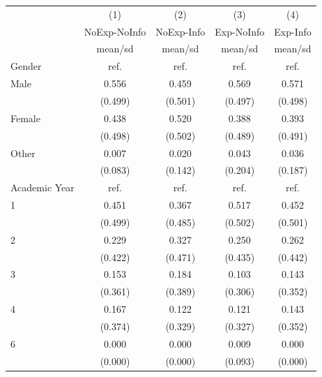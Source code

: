 {
\def\sym#1{\ifmmode^{#1}\else\(^{#1}\)\fi}
\begin{tabular}{l*{4}{c}}
\toprule
                    &\multicolumn{1}{c}{(1)}&\multicolumn{1}{c}{(2)}&\multicolumn{1}{c}{(3)}&\multicolumn{1}{c}{(4)}\\
                    &\multicolumn{1}{c}{NoExp-NoInfo}&\multicolumn{1}{c}{NoExp-Info}&\multicolumn{1}{c}{Exp-NoInfo}&\multicolumn{1}{c}{Exp-Info}\\
                    &     mean/sd&     mean/sd&     mean/sd&     mean/sd\\
\midrule
Gender              &        ref.&        ref.&        ref.&        ref.\\
Male                &       0.556&       0.459&       0.569&       0.571\\
                    &     (0.499)&     (0.501)&     (0.497)&     (0.498)\\
Female              &       0.438&       0.520&       0.388&       0.393\\
                    &     (0.498)&     (0.502)&     (0.489)&     (0.491)\\
Other               &       0.007&       0.020&       0.043&       0.036\\
                    &     (0.083)&     (0.142)&     (0.204)&     (0.187)\\
Academic Year       &        ref.&        ref.&        ref.&        ref.\\
1                   &       0.451&       0.367&       0.517&       0.452\\
                    &     (0.499)&     (0.485)&     (0.502)&     (0.501)\\
2                   &       0.229&       0.327&       0.250&       0.262\\
                    &     (0.422)&     (0.471)&     (0.435)&     (0.442)\\
3                   &       0.153&       0.184&       0.103&       0.143\\
                    &     (0.361)&     (0.389)&     (0.306)&     (0.352)\\
4                   &       0.167&       0.122&       0.121&       0.143\\
                    &     (0.374)&     (0.329)&     (0.327)&     (0.352)\\
6                   &       0.000&       0.000&       0.009&       0.000\\
                    &     (0.000)&     (0.000)&     (0.093)&     (0.000)\\

\end{tabular}}
